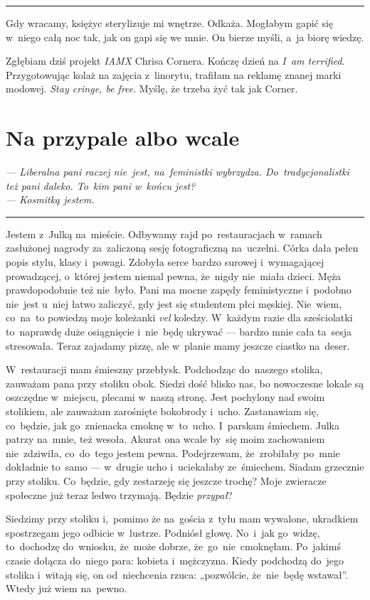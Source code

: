 \documentclass[9pt, a5paper]{memoir}
\begin{document}
\fancybreak{* \quad * \quad *}

Gdy wracamy, księżyc sterylizuje mi wnętrze. Odkaża. Mogłabym gapić się w~niego całą noc tak, jak on gapi się we mnie. On bierze myśli, a~ja biorę wiedzę.

Zgłębiam dziś projekt \textit{IAMX} Chrisa Cornera. Kończę dzień na \textit{I~am terrified}. Przygotowując kolaż na zajęcia z~linorytu, trafiłam na reklamę znanej marki modowej. \textit{Stay cringe, be free}. Myślę, że trzeba żyć tak jak Corner.

\newpage
\section{Na przypale albo wcale}
{
\itshape
--- Liberalna pani raczej nie~jest, na~feministki wybrzydza. Do~tradycjonalistki też pani daleko. To~kim pani w~końcu jest?\\
--- Kosmitką jestem.
}

\fancybreak{* \quad * \quad *}

Jestem z~Julką na~mieście. Odbywamy rajd po~restauracjach w~ramach zasłużonej nagrody za~zaliczoną sesję fotograficzną na~uczelni. Córka dała pełen popis stylu, klasy i~powagi. Zdobyła serce bardzo surowej i~wymagającej prowadzącej, o~której jestem niemal pewna, że~nigdy nie~miała dzieci. Męża prawdopodobnie też nie~było. Pani ma mocne zapędy feministyczne i~podobno nie~jest u~niej łatwo zaliczyć, gdy jest się studentem płci męskiej. Nie~wiem, co~na~to powiedzą moje koleżanki \textit{vel} koledzy. W~każdym razie dla sześciolatki to~naprawdę duże osiągnięcie i~nie~będę ukrywać --- bardzo mnie cała ta~sesja stresowała. Teraz zajadamy pizzę, ale w~planie mamy jeszcze ciastko na~deser.

W~restauracji mam śmieszny przebłysk. Podchodząc do~naszego stolika, zauważam pana przy stoliku obok. Siedzi dość blisko nas, bo nowoczesne lokale są oszczędne w~miejscu, plecami w~naszą stronę. Jest pochylony nad swoim stolikiem, ale zauważam zarośnięte bokobrody i~ucho. Zastanawiam się, co~będzie, jak go~znienacka cmoknę w~to~ucho. I~parskam śmiechem. Julka patrzy na~mnie, też wesoła. Akurat ona wcale by~się moim zachowaniem nie~zdziwiła, co~do~tego jestem pewna. Podejrzewam, że~zrobiłaby po~mnie dokładnie to~samo --- w~drugie ucho i~uciekałaby ze~śmiechem. Siadam grzecznie przy stoliku. Co~będzie, gdy zestarzeję się jeszcze trochę? Moje zwieracze społeczne już teraz ledwo trzymają. Będzie \textit{przypał}?

Siedzimy przy stoliku i,~pomimo że na~gościa z~tyłu mam wywalone, ukradkiem spostrzegam jego odbicie w~lustrze. Podniósł głowę. No~i~jak go~widzę, to~dochodzę do~wniosku, że~może dobrze, że~go~nie~cmoknęłam. Po~jakimś czasie dołącza do~niego para: kobieta i~mężczyzna. Kiedy podchodzą do~jego stolika i~witają się, on od~niechcenia rzuca: „pozwólcie, że~nie~będę wstawał”. Wtedy już wiem na~pewno.
\end{document}
